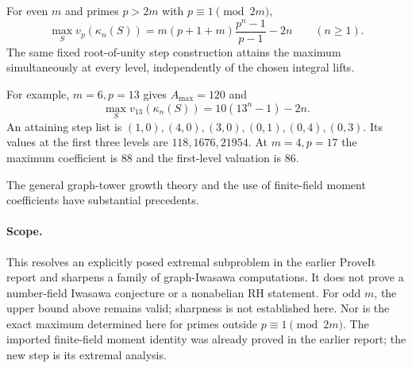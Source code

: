 \begin{corollary}
For even $m$ and primes $p>2m$ with $p\equiv1\pmod{2m}$,
\[
 \boxed{\quad
 \max_S v_p(\kappa_n(S))
       =m(p+1+m)\frac{p^n-1}{p-1}-2n
       \qquad(n\ge1).
 \quad}
\]
The same fixed root-of-unity step construction attains the maximum
simultaneously at every level, independently of the chosen integral lifts.
\end{corollary}

For example, $m=6,p=13$ gives $A_{\max}=120$ and
\[
               \max_S v_{13}(\kappa_n(S))=10(13^n-1)-2n.
\]
An attaining step list is $(1,0),(4,0),(3,0),(0,1),(0,4),(0,3)$.
Its values at the first three levels are $118,1676,21954$.
At $m=4,p=17$ the maximum coefficient is $88$ and the first-level
valuation is $86$.

The general graph-tower growth theory and the use of finite-field moment
coefficients have substantial precedents.\cite{graphDV,graphDLRV}

\paragraph{Scope.}
This resolves an explicitly posed extremal subproblem in the earlier
ProveIt report and sharpens a family of graph-Iwasawa computations. It does
not prove a number-field Iwasawa conjecture or a nonabelian RH statement.
For odd $m$, the upper bound above remains valid; sharpness is not established
here. Nor is the exact maximum determined here for primes outside
$p\equiv1\pmod{2m}$. The imported finite-field moment identity was already
proved in the earlier report; the new step is its extremal analysis.
